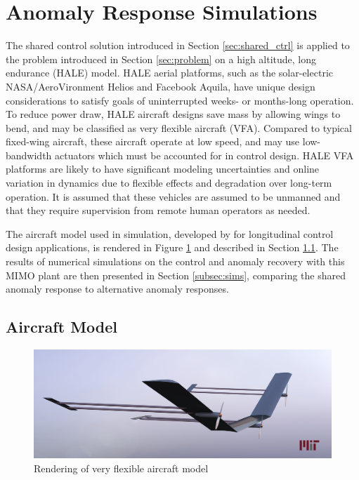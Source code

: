 \documentclass[english]{ifacconf}
\begin{document}
\section{Anomaly Response Simulations} \label{sec:vfa}
The shared control solution introduced in Section \ref{sec:shared_ctrl} is applied to the problem introduced in Section \ref{sec:problem} on a high altitude, long endurance (HALE) model. HALE aerial platforms, such as the solar-electric NASA/AeroVironment Helios and Facebook Aquila, have unique design considerations to satisfy goals of uninterrupted weeks- or months-long operation. To reduce power draw, HALE aircraft designs save mass by allowing wings to bend, and may be classified as very flexible aircraft (VFA). Compared to typical fixed-wing aircraft, these aircraft operate at low speed, and may use low-bandwidth actuators which must be accounted for in control design. HALE VFA platforms are likely to have significant modeling uncertainties and online variation in dynamics due to flexible effects and degradation over long-term operation. It is assumed that these vehicles are assumed to be unmanned and that they require supervision from remote human operators as needed.

The aircraft model used in simulation, developed by \cite{gibson2011modeling} for longitudinal control design applications, is rendered in Figure \ref{fig:vfa} and described in Section \ref{subsec:vfa_model}. The results of numerical simulations on the control and anomaly recovery with this MIMO plant are then presented in Section \ref{subsec:sims}, comparing the shared anomaly response to alternative anomaly responses.

\subsection{Aircraft Model}\label{subsec:vfa_model}
\begin{figure}[htbp]
	\centering
	\includegraphics[width=0.95\columnwidth]{../fig/VFA_16.jpg}
	\caption{Rendering of very flexible aircraft model}
	\label{fig:vfa}
\end{figure}
\end{document}
